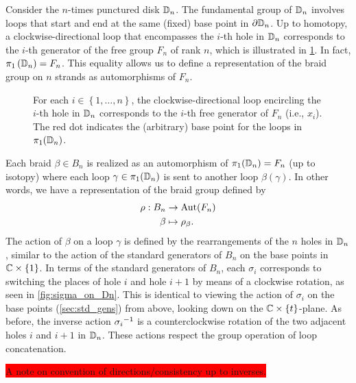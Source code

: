Consider the $n$-times punctured disk $\mathbb{D}_n$. The fundamental group of $\mathbb{D}_n$ involves loops that start and end at the same (fixed) base point in $\partial\mathbb{D}_n$. Up to homotopy, a clockwise-directional loop that encompasses the $i$-th hole in $\mathbb{D}_n$ corresponds to the $i$-th generator of the free group $F_n$ of rank $n$, which is illustrated in \cref{fig:Gen_on_Dn}. In fact, $\pi_1\left( \mathbb{D}_n \right) = F_n$. This equality allows us to define a representation of the braid group on $n$ strands as automorphisms of $F_n$.

\begin{figure}[htbp]
    \centering
    
    \caption{For each $i\in\left\{ 1,\dots,n \right\}$, the clockwise-directional loop encircling the $i$-th hole in $\mathbb{D}_n$ corresponds to the $i$-th free generator of $F_n$ (i.e., $x_i$). The red dot indicates the (arbitrary) base point for the loops in $\pi_1(\mathbb{D}_n)$.}\label{fig:Gen_on_Dn}
\end{figure}

Each braid $\beta\in B_n$ is realized as an automorphism of $\pi_1(\mathbb{D}_n) = F_n$ (up to isotopy) where each loop $\gamma\in\pi_1(\mathbb{D}_n)$ is sent to another loop $\beta(\gamma)$. In other words, we have a representation of the braid group defined by
\begin{align}
    \rho: B_n &\to \textrm{Aut}\!\left( F_n \right) \\
    \beta &\mapsto \rho_\beta.
\end{align}
The action of $\beta$ on a loop $\gamma$ is defined by the rearrangements of the $n$ holes in $\mathbb{D}_n$, similar to the action of the standard generators of $B_n$ on the base points in $\mathbb{C}\times\left\{ 1 \right\}$. In terms of the standard generators of $B_n$, each $\sigma_i$ corresponds to switching the places of hole $i$ and hole $i+1$ by means of a clockwise rotation, as seen in \cref{fig:sigma_on_Dn}. This is identical to viewing the action of $\sigma_i$ on the base points (\cref{sec:std_gens}) from above, looking down on the $\mathbb{C}\times\left\{ t \right\}$-plane. As before, the inverse action ${ \sigma_i }^{-1}$ is a counterclockwise rotation of the two adjacent holes $i$ and $i+1$ in $\mathbb{D}_n$. These actions respect the group operation of loop concatenation.

\colorbox{red}{A note on convention of directions/consistency up to inverses.}


